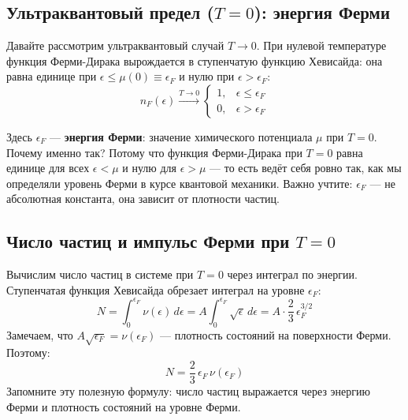 \documentclass[../general/general]{subfiles}
\begin{document}
\subsection{Ультраквантовый предел ($T = 0$): энергия Ферми}

Давайте рассмотрим ультраквантовый случай $T \to 0$. При нулевой температуре функция Ферми-Дирака вырождается в ступенчатую функцию Хевисайда: она равна единице при $\epsilon \leq \mu(0) \equiv \epsilon_F$ и нулю при $\epsilon > \epsilon_F$:
\begin{equation}
    n_F(\epsilon) \xrightarrow{T \to 0} \begin{cases} 1, & \epsilon \leq \epsilon_F \\ 0, & \epsilon > \epsilon_F \end{cases}
\end{equation}

Здесь $\epsilon_F$ — \textbf{энергия Ферми}: значение химического потенциала $\mu$ при $T = 0$. Почему именно так? Потому что функция Ферми-Дирака при $T = 0$ равна единице для всех $\epsilon < \mu$ и нулю для $\epsilon > \mu$ — то есть ведёт себя ровно так, как мы определяли уровень Ферми в курсе квантовой механики. Важно учтите: $\epsilon_F$ — не абсолютная константа, она зависит от плотности частиц.

\subsection{Число частиц и импульс Ферми при $T = 0$}

Вычислим число частиц в системе при $T = 0$ через интеграл по энергии. Ступенчатая функция Хевисайда обрезает интеграл на уровне $\epsilon_F$:
\begin{equation}
    N = \int_0^{\epsilon_F} \nu(\epsilon)\, d\epsilon = A \int_0^{\epsilon_F} \sqrt{\epsilon}\, d\epsilon = A \cdot \frac{2}{3}\, \epsilon_F^{3/2}
\end{equation}
Замечаем, что $A \sqrt{\epsilon_F} = \nu(\epsilon_F)$ — плотность состояний на поверхности Ферми. Поэтому:
\begin{equation}
    N = \frac{2}{3}\, \epsilon_F\, \nu(\epsilon_F)
\end{equation}
Запомните эту полезную формулу: число частиц выражается через энергию Ферми и плотность состояний на уровне Ферми.
\end{document}

